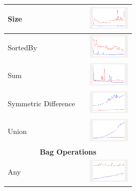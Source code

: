 \begin{longtable}{ m{2.5cm} m{8cm} m{2cm} }
Size &

&
\includegraphics[width=2cm]{graphs/set/small/Size}
\\\hline

SortedBy &

&
\includegraphics[width=2cm]{graphs/set/small/sortedBy}
\\\hline

Sum &

&
\includegraphics[width=2cm]{graphs/set/small/Sum}
\\\hline

Symmetric Difference &

&
\includegraphics[width=2cm]{graphs/set/small/SymmetricDif}
\\\hline

Union &

&
\includegraphics[width=2cm]{graphs/set/small/Union}
\\\hline

 \multicolumn{3}{c}{{\bf Bag Operations}}\\\hline
 
 Any &
  
  & 
  	\includegraphics[width=2cm]{graphs/bag/small/Any}
  \\\hline
  

\end{longtable}
